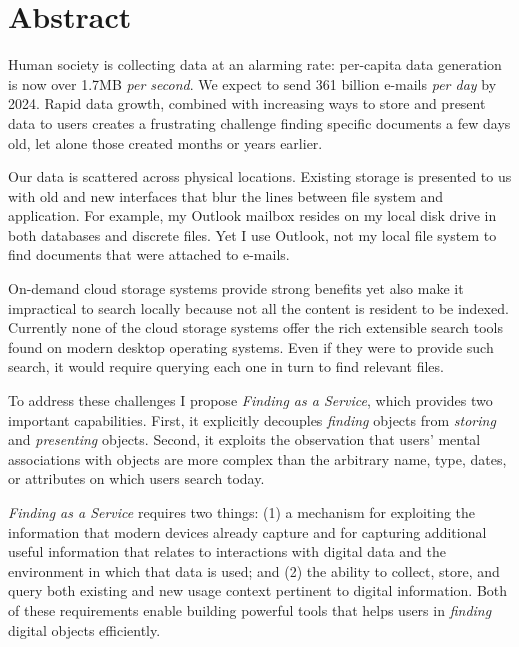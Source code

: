 \chapter{Abstract}

Human society is collecting data at an alarming rate: per-capita data generation
is now over 1.7MB \emph{per second}. We expect to send 361 billion e-mails
\emph{per day} by 2024. Rapid data growth, combined with increasing ways to
store and present data to users creates a frustrating challenge finding specific
documents a few days old, let alone those created months or years earlier.

Our data is scattered across physical locations.  Existing storage is presented
to us with old and new interfaces that blur the lines between file system and
application. For example, my Outlook mailbox resides on my local disk
drive in both databases and discrete files.  Yet I use Outlook, not my local
file system to find documents that were attached to e-mails.

On-demand cloud storage systems provide strong benefits yet also make it
impractical to search locally because not all the content is resident to be
indexed. Currently none of the cloud storage systems offer the rich extensible
search tools found on modern desktop operating systems.  Even if they were to
provide such search, it would require querying each one in turn to find relevant
files.

To address these challenges I propose \emph{Finding as a Service}, which provides two
important capabilities.  First, it explicitly decouples \emph{finding} objects from
\emph{storing} and \emph{presenting} objects.  Second, it exploits the
observation that users' mental associations with objects are more complex than
the arbitrary name, type, dates, or attributes on which users search today.

\emph{Finding as a Service} requires two things: (1) a mechanism for exploiting
the information that modern devices already capture and for capturing
additional useful information that relates to interactions with digital data and
the environment in which that data is used; and (2) the ability to collect,
store, and query both existing and new usage context pertinent to digital
information. Both of these requirements enable building powerful tools that
helps users in \emph{finding} digital objects efficiently.



